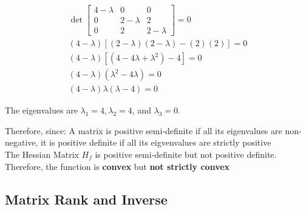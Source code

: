 \begin{enumerate}
    $$
    \begin{gathered}
    \operatorname{det}\left[\begin{array}{ccc}
    4-\lambda & 0 & 0 \\
    0 & 2-\lambda & 2 \\
    0 & 2 & 2-\lambda
    \end{array}\right]=0 \\
    (4-\lambda)[(2-\lambda)(2-\lambda)-(2)(2)]=0 \\
    (4-\lambda)\left[\left(4-4 \lambda+\lambda^2\right)-4\right]=0 \\
    (4-\lambda)\left(\lambda^2-4 \lambda\right)=0 \\
    (4-\lambda) \lambda(\lambda-4)=0
    \end{gathered}
    $$

The eigenvalues are $\lambda_1=4, \lambda_2=4$, and $\lambda_3=0$.

Therefore, since:
A matrix is positive semi-definite if all its eigenvalues are non-negative, it is positive definite if all its eigvenvalues are strictly positive\\
The Hessian Matrix \(H_f\) is positive semi-definite but not positive definite. \\
Therefore, the function is \textbf{convex} but \textbf{not strictly convex}
    
\end{enumerate}

\subsection{Matrix Rank and Inverse}

